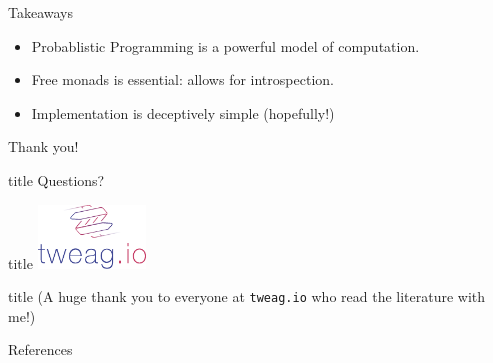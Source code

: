 \documentclass{beamer}
\begin{document}
\begin{frame}[fragile]{Takeaways}
    \begin{itemize}
        \item Probablistic Programming is a powerful model of computation.
        \item Free monads is essential: allows for introspection.
        \item Implementation is deceptively simple (hopefully!)
    \end{itemize}
\end{frame}

\begin{frame}[fragile]{Thank you!}
  \begin{beamercolorbox}[center]{title}
    Questions?
  \end{beamercolorbox}





  \vfill
  \begin{beamercolorbox}[center]{title}
        \includegraphics[height=64px]{res/tweag-io.pdf}
  \end{beamercolorbox}

  \begin{beamercolorbox}[center]{title}
    (A huge thank you to everyone at \texttt{tweag.io} who read the literature with me!)
  \end{beamercolorbox}
\end{frame}


\begin{frame}[allowframebreaks]{References}
        
        \nocite{*}
        
\end{frame}
\end{document}
